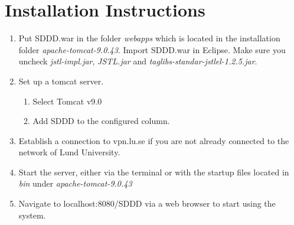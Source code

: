 \documentclass{article}
\begin{document}
   




\newpage
\section{Installation Instructions}

\begin{enumerate}
    \item Put SDDD.war in the folder \textit{webapps} which is located in the installation folder \textit{apache-tomcat-9.0.43}. Import SDDD.war in Eclipse. Make sure you uncheck \textit{jstl-impl.jar}, \textit{JSTL.jar} and \textit{taglibs-standar-jstlel-1.2.5.jar}.
    \item Set up a tomcat server. 
    		\begin{enumerate}
    			\item Select Tomcat v9.0
    			\item Add SDDD to the configured column. 
    		\end{enumerate}
    \item Establish a connection to vpn.lu.se if you are not already connected to the network of Lund University.
    \item Start the server, either via the terminal or with the startup files located in \textit{bin} under \textit{apache-tomcat-9.0.43} 
    \item Navigate to localhost:8080/SDDD via a web browser to start using the system.
\end{enumerate}



\end{document}
